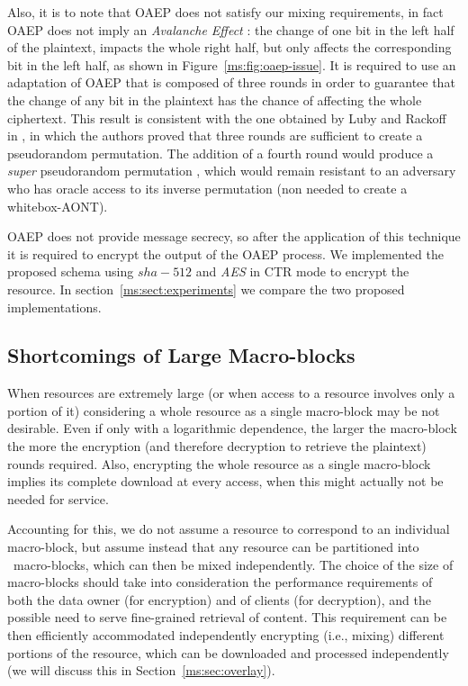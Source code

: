 {Also, it is to note that OAEP does not satisfy our mixing requirements, in fact OAEP does not imply an {\em Avalanche Effect} \cite{webster1985design}: the change of one bit in the left half of the plaintext, impacts the whole right half, but only affects the corresponding bit in the left half, as shown in Figure~\ref{ms:fig:oaep-issue}. It is required to use an adaptation of OAEP that is composed of three rounds in order to guarantee that the change of any bit in the plaintext has the chance of affecting the whole ciphertext. This result is consistent with the one obtained by Luby and Rackoff in \cite{lr88}, in which the authors proved that three rounds are sufficient to create a pseudorandom permutation. The addition of a fourth round would produce a {\em super} pseudorandom permutation \cite{lr88}, which would remain resistant to an adversary who has oracle access to its inverse permutation (non needed to create a whitebox-AONT).

OAEP does not provide message secrecy, so after the application of this technique it is required to encrypt the output of the OAEP process. We implemented the proposed schema using $sha-512$ and {\em AES} in {CTR mode} to encrypt the resource.
In section~\ref{ms:sect:experiments} we compare the two proposed implementations.

} %

\subsection{Shortcomings of Large Macro-blocks}

When resources are extremely large (or when access to a resource involves only a portion of it) considering a whole resource as a single macro-block may be not desirable. Even if only with a logarithmic dependence, the larger the macro-block the more the encryption (and therefore decryption to retrieve the plaintext) rounds required. Also, encrypting the whole resource as a single macro-block implies its complete download at every access, when this might actually not be needed for service.

Accounting for this, we do not assume a resource to correspond to an individual macro-block, but assume instead that any resource can be partitioned into \Mnum\ macro-blocks, which can then be mixed independently. The choice of the size of macro-blocks should take into consideration the performance requirements of both the data owner (for encryption) and of clients (for decryption), and the possible need to serve fine-grained retrieval of content. This requirement can be then efficiently accommodated independently encrypting (i.e., mixing) different portions of the resource, which can be downloaded and processed independently (we will discuss this in Section~\ref{ms:sec:overlay}).

